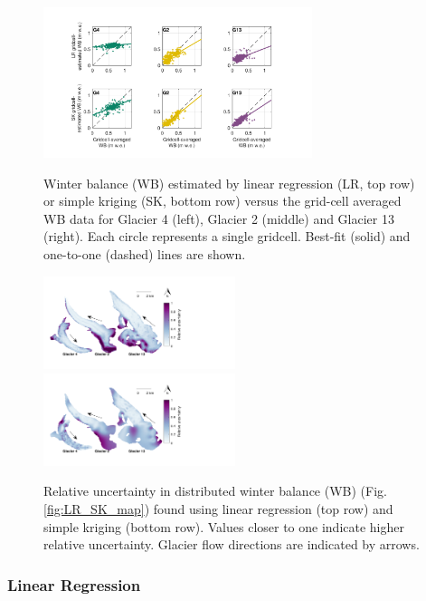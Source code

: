 \documentclass[twocolumn, letterpaper]{igs}
\begin{document}
\begin{figure}
	\centering
	\includegraphics[width =0.7\textwidth]{observedVSestimated_S2.pdf}\\
	\caption{Winter balance (WB) estimated by linear regression (LR, top row) or simple kriging (SK, bottom row) versus the grid-cell averaged WB data for Glacier 4 (left), Glacier 2 (middle) and Glacier 13 (right). Each circle represents a single gridcell. Best-fit (solid) and one-to-one (dashed) lines are shown.}
	\label{fig:observedVSestimated_S2}
\end{figure}

\begin{figure}
	\centering
	\includegraphics[width =0.5\textwidth]{SpatialVar_LR.pdf}\\
	\includegraphics[width =0.5\textwidth]{SpatialVar_SK.pdf}\\
	\caption{Relative uncertainty in distributed winter balance (WB) (Fig. \ref{fig:LR_SK_map}) found using linear regression (top row) and simple kriging (bottom row). Values closer to one indicate higher relative uncertainty. Glacier flow directions are indicated by arrows.}
	\label{fig:WSMBspatialvar}
\end{figure}

\subsubsection{Linear Regression}
\end{document}
